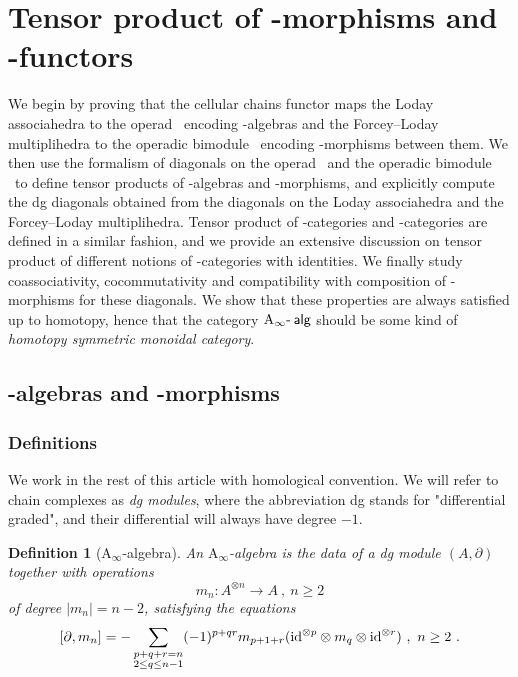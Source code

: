 \documentclass[twoside, 11pt]{amsart}
\newtheorem{definition}{Definition}[section]
\theoremstyle{remark}
\begin{document}

\section{Tensor product of \Ainf -morphisms and \Ainf -functors}
\label{sec:IV}

We begin by proving that the cellular chains functor maps the Loday associahedra to the operad \Ainf\ encoding \Ainf -algebras and the Forcey--Loday multiplihedra to the operadic bimodule \Minf\ encoding \Ainf -morphisms between them.
We then use the formalism of diagonals on the operad \Ainf\ and the operadic bimodule \Minf\ to define tensor products of \Ainf -algebras and \Ainf -morphisms, and explicitly compute the dg diagonals obtained from the diagonals on the Loday associahedra and the Forcey--Loday multiplihedra.
Tensor product of \Ainf -categories and \Ainf -categories are defined in a similar fashion, and we provide an extensive discussion on tensor product of different notions of \Ainf -categories with identities.
We finally study coassociativity, cocommutativity and compatibility with composition of \Ainf -morphisms for these diagonals. We show that these properties are always satisfied up to homotopy, hence that the category $\mathrm{A}_\infty\text{-\hspace{2pt}}\mathsf{alg}$ should be some kind of \textit{homotopy symmetric monoidal category}.

\subsection{\Ainf -algebras and \Ainf -morphisms} \label{ss:ainf-alg-ainf-morph}

\subsubsection{Definitions}

We work in the rest of this article with homological convention. 
We will refer to chain complexes as \emph{dg modules}, where the abbreviation dg stands for "differential graded", and their differential will always have degree $-1$.

\begin{definition}[$\mathrm{A}_\infty$-algebra] \label{def:ainf-alg} An \emph{$\mathrm{A}_\infty$-algebra} is the data of a dg module $(A,\partial)$ together with operations \[ m_n : A^{\otimes n} \to A \ , \ n \geq 2 \] of degree $|m_n|=n-2$, satisfying the equations 
\[ [ \partial , m_n ] = - \sum_{\substack{p+q+r=n \\ 2 \leq q \leq n-1}} (-1)^{p+qr}m_{p+1+r}(\mathrm{id}^{\otimes p} \otimes m_q \otimes \mathrm{id}^{\otimes r}) \ , \ n\geq 2 \ . \]
\end{definition}
\end{document}
